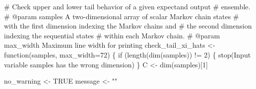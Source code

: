 \documentclass[
  letterpaper,
  DIV=11,
  numbers=noendperiod]{scrartcl}
\newenvironment{Shaded}{\begin{snugshade}}{\end{snugshade}}
\newcommand{\CommentTok}[1]{\textcolor[rgb]{0.37,0.37,0.37}{#1}}
\newcommand{\ControlFlowTok}[1]{\textcolor[rgb]{0.00,0.23,0.31}{#1}}
\newcommand{\DecValTok}[1]{\textcolor[rgb]{0.68,0.00,0.00}{#1}}
\newcommand{\NormalTok}[1]{\textcolor[rgb]{0.00,0.23,0.31}{#1}}
\newcommand{\OperatorTok}[1]{\textcolor[rgb]{0.37,0.37,0.37}{#1}}
\newcommand{\StringTok}[1]{\textcolor[rgb]{0.13,0.47,0.30}{#1}}
\begin{document}
\begin{Shaded}
\begin{Highlighting}[]
\CommentTok{\# Check upper and lower tail behavior of a given expectand output }
\CommentTok{\# ensemble.}
\CommentTok{\# @param samples A two{-}dimensional array of scalar Markov chain states }
\CommentTok{\#                with the first dimension indexing the Markov chains and }
\CommentTok{\#                the second dimension indexing the sequential states }
\CommentTok{\#                within each Markov chain.}
\CommentTok{\# @param max\_width Maximum line width for printing}
\NormalTok{check\_tail\_xi\_hats }\OperatorTok{\textless{}{-}}\NormalTok{ function(samples, max\_width}\OperatorTok{=}\DecValTok{72}\NormalTok{) \{}
  \ControlFlowTok{if}\NormalTok{ (length(dim(samples)) }\OperatorTok{!=} \DecValTok{2}\NormalTok{) \{}
\NormalTok{    stop(}\StringTok{\textquotesingle{}Input variable \textasciigrave{}samples\textasciigrave{} has the wrong dimension\textquotesingle{}}\NormalTok{)}
\NormalTok{  \}}
\NormalTok{  C }\OperatorTok{\textless{}{-}}\NormalTok{ dim(samples)[}\DecValTok{1}\NormalTok{]}
  
\NormalTok{  no\_warning }\OperatorTok{\textless{}{-}}\NormalTok{ TRUE}
\NormalTok{  message }\OperatorTok{\textless{}{-}} \StringTok{""}
  

\end{Highlighting}
\end{Shaded}
\end{document}
